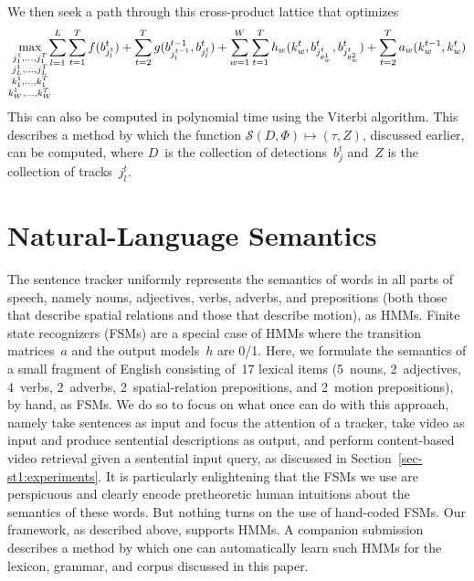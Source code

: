 %
We then seek a path through this cross-product lattice that optimizes
%
\begin{equation*}
  \max_{\substack{j^1_1,\ldots,j^T_1\\j^1_L,\ldots,j^T_L\\
      k^1_1,\ldots,k^T_1\\k^1_W,\ldots,k^T_W}}\hspace*{-1ex}
    \sum_{l=1}^L
    \sum_{t=1}^Tf(b^t_{j^t_l})+
    \sum_{t=2}^Tg(b^{t-1}_{j^{t-1}_l},b^t_{j^t_l})+
      \sum_{w=1}^W
      \sum_{t=1}^Th_w(k^t_w,b^t_{j^t_{\theta^1_w}},b^t_{j^t_{\theta^2_w}})
      \displaystyle
      {}+\sum_{t=2}^Ta_w(k^{t-1}_w,k^t_w)
\end{equation*}
%
This can also be computed in polynomial time using the Viterbi algorithm.
%
This describes a method by which the function
$\mathcal{S}(D,\Phi)\mapsto(\tau,Z)$, discussed earlier, can be computed, where
$D$~is the collection of detections~$b^t_j$ and~$Z$ is the collection of
tracks~$j^t_l$.

\section{Natural-Language Semantics}
\label{sec-st1:semantics}

The sentence tracker uniformly represents the semantics of words in all parts
of speech, namely nouns, adjectives, verbs, adverbs, and prepositions (both
those that describe spatial relations and those that describe motion), as HMMs.
%
Finite state recognizers (FSMs) are a special case of HMMs where the transition
matrices~$a$ and the output models~$h$ are 0/1.
%
Here, we formulate the semantics of a small fragment of English consisting
of~17 lexical items (5~nouns, 2~adjectives, 4~verbs, 2~adverbs,
2~spatial-relation prepositions, and 2~motion prepositions), by hand, as FSMs.
%
We do so to focus on what once can do with this approach, namely take sentences
as input and focus the attention of a tracker, take video as input and produce
sentential descriptions as output, and perform content-based video retrieval
given a sentential input query, as discussed in Section~\ref{sec-st1:experiments}.
%
It is particularly enlightening that the FSMs we use are perspicuous and
clearly encode pretheoretic human intuitions about the semantics of these words.
%
But nothing turns on the use of hand-coded FSMs.
%
Our framework, as described above, supports HMMs.
%
A companion submission describes a method by which one can automatically learn
such HMMs for the lexicon, grammar, and corpus discussed in this paper.


